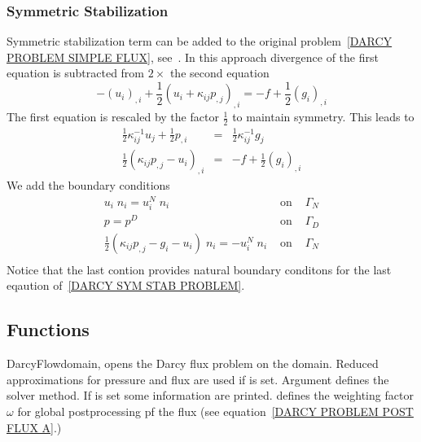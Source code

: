 \subsubsection{Symmetric Stabilization \label{SEC DARCY SYM STAB}}
Symmetric stabilization term can be added to the original problem~\ref{DARCY PROBLEM SIMPLE FLUX}, see~\cite{LoulaCorrea2006a}. In this approach divergence of the first equation
is subtracted from $2 \times$ the second equation  
\begin{equation}\label{DARCY SYM STAB PROBLEM A}
- (u_{i})_{,i} + \frac{1}{2} \left( u_{i} + \kappa_{ij} p_{,j} \right)_{,i} = -  f + \frac{1}{2} \left( g_{i}\right)_{,i} 
\end{equation} 
The first equation is rescaled by the factor $\frac{1}{2}$ to maintain symmetry. This leads to
\begin{equation}\label{DARCY SYM STAB PROBLEM}
\begin{array}{rcl}
\frac{1}{2}   \kappa^{-1}_{ij} u_{j} + \frac{1}{2}  p_{,i}& = &  \frac{1}{2}  \kappa^{-1}_{ij} g_{j} \\
\frac{1}{2}  \left(  \kappa_{ij} p_{,j} - u_{i} \right)_{,i} & = & -  f + \frac{1}{2}  \left(g_{i}\right)_{,i} 
\end{array}
\end{equation} 
We add the boundary conditions 
\begin{equation}\label{DARCY SYM STAB PROBLEM BOUNDARY}
\begin{array}{rcl}
u_{i} \; n_{i}  = u^{N}_{i}  \; n_{i} & \mbox{ on } & \Gamma_{N} \\
p = p^{D} &  \mbox{ on } & \Gamma_{D} \\ 
\frac{1}{2} \left( \kappa_{ij} p_{,j} - g_{i} - u_{i} \right ) \; n_{i}
=  - u^{N}_{i}  \; n_{i} & \mbox{ on } & \Gamma_{N} \\
\end{array}
\end{equation} 
Notice that the last contion provides natural boundary conditons for the last eqaution of~\ref{DARCY SYM STAB PROBLEM}.



\subsection{Functions}
\begin{classdesc}{DarcyFlow}{domain, }
opens the Darcy flux problem on the \Domain domain. 
Reduced approximations for pressure and flux are used if  is set.
Argument  defines the solver method. 
If  is set some information are printed.
 defines the weighting factor $\omega$ for global postprocessing pf the flux (see equation~\ref{DARCY PROBLEM POST FLUX A}.)
\end{classdesc}

